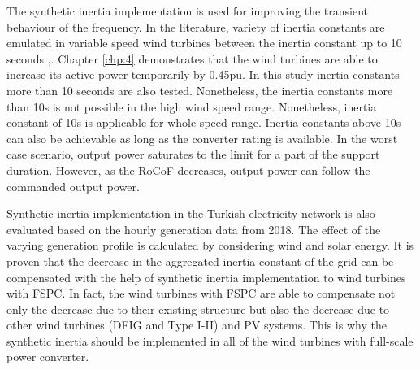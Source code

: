 The synthetic inertia implementation is used for improving the transient behaviour of the frequency. In the literature, variety of inertia constants are emulated in variable speed wind turbines between the inertia constant up to 10 seconds \cite{Gonzalez-Longatt2013},\cite{Gonzalez-Longatt}. Chapter \ref{chp:4} demonstrates that the wind turbines are able to increase its active power temporarily by 0.45pu. In this study inertia constants more than 10 seconds are also tested. Nonetheless, the inertia constants more than 10s is not possible in the high wind speed range. Nonetheless, inertia constant of 10s is applicable for whole speed range. Inertia constants above 10s can also be achievable as long as the converter rating is available. In the worst case scenario, output power saturates to the limit for a part of the support duration. However, as the RoCoF decreases, output power can follow the commanded output power.\par 
Synthetic inertia implementation in the Turkish electricity network is also evaluated based on the hourly generation data from 2018. The effect of the varying generation profile is calculated by considering wind and solar energy. It is proven that the decrease in the aggregated inertia constant of the grid can be compensated with the help of synthetic inertia implementation to wind turbines with FSPC. In fact, the wind turbines with FSPC are able to compensate not only the decrease due to their existing structure but also the decrease due to other wind turbines (DFIG and Type I-II) and PV systems. This is why the synthetic inertia should be implemented in all of the wind turbines with full-scale power converter.
